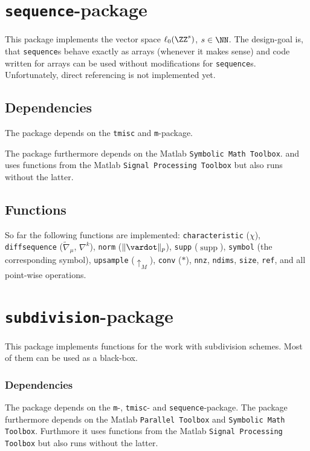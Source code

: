 \section{\texttt{sequence}-package}
This package implements the vector space $\ell_0(\ZZ^s)$, $s\in\NN$.
The design-goal is, that \texttt{sequence}s behave exactly as arrays (whenever it makes sense) and code written for arrays can be used without modifications for \texttt{sequence}s. Unfortunately, direct referencing is not implemented yet. 

\subsection*{Dependencies}
The package depends on the \texttt{tmisc} and \texttt{m}-package. 

The package furthermore depends on the Matlab \texttt{Symbolic Math Toolbox}.
and uses functions from the Matlab \texttt{Signal Processing Toolbox} but also runs without the latter.

\subsection*{Functions}

So far the following functions are implemented:
\texttt{characteristic}   ($\chi$), 
\texttt{diffsequence}   ($\tilde{\nabla}_\mu$, $\nabla^k$), 
\texttt{norm} ($\|\vardot\|_p$), 
\texttt{supp} ($\operatorname{supp}$), 
\texttt{symbol} (the corresponding symbol),
\texttt{upsample} ($\uparrow_M$),
\texttt{conv} ($\ast$),
\texttt{nnz},
\texttt{ndims},
\texttt{size},
\texttt{ref},
and all point-wise operations. 


\section{\texttt{subdivision}-package}
This package implements functions for the work with subdivision schemes. Most of them can be used as a black-box.

\subsubsection*{Dependencies}
The package depends on the \texttt{m}-, \texttt{tmisc}- and \texttt{sequence}-package.
The package furthermore depends on the Matlab
\texttt{Parallel Toolbox} and \texttt{Symbolic Math Toolbox}.
Furthmore it uses functions from the Matlab \texttt{Signal Processing Toolbox} but also runs without the latter.

